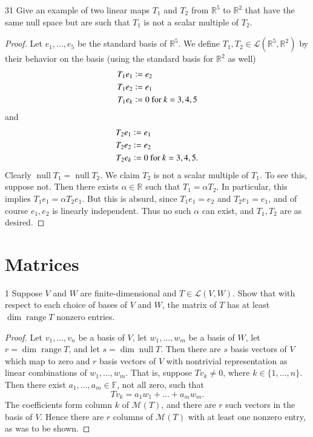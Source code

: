 \documentclass[11pt]{extarticle}
\newenvironment{problem}[1]{\begin{prob*}{#1}{}}{\end{prob*}}
\newcommand{\R}{\mathbb{R}}
\newcommand{\F}{\mathbb{F}}
\newcommand{\mat}{\mathcal{M}}
\newcommand{\Hom}{\mathcal{L}}
\DeclareMathOperator{\Null}{null}
\DeclareMathOperator{\Range}{range}
\newcommand{\defeq}{\vcentcolon=}
\begin{document}
\begin{problem}{31}
Give an example of two linear maps $T_1$ and $T_2$ from $\R^5$ to $\R^2$ that have the same null space but are such that $T_1$ is not a scalar multiple of $T_2$.  
\end{problem}
\begin{proof}
Let $e_1,\dots, e_5$ be the standard basis of $\R^5$.  We define $T_1,T_2\in\Hom(\R^5,\R^2)$ by their behavior on the basis (using the standard basis for $\R^2$ as well)
\begin{align*}
T_1e_1 &\defeq e_2\\
T_1e_2 &\defeq e_1\\
T_1e_k &\defeq 0 \text{ for }k = 3, 4, 5
\end{align*} 
and 
\begin{align*}
T_2e_1 &\defeq e_1\\
T_2e_2 &\defeq e_2\\
T_2e_k &\defeq 0 \text{ for }k = 3, 4, 5.
\end{align*}
Clearly $\Null T_1 = \Null T_2$.  We claim $T_2$ is not a scalar multiple of $T_1$.  To see this, suppose not.  Then there exists $\alpha\in\R$ such that $T_1 = \alpha T_2$.  In particular, this implies $T_1e_1 = \alpha T_2e_1$.  But this is absurd, since $T_1e_1 = e_2$ and $T_2e_1 = e_1$, and of course $e_1,e_2$ is linearly independent.  Thus no such $\alpha$ can exist, and $T_1,T_2$ are as desired.
\end{proof}


\section{Matrices}

\begin{problem}{1}
Suppose $V$ and $W$ are finite-dimensional and $T\in\Hom(V,W)$.  Show that with respect to each choice of bases of $V$ and $W$, the matrix of $T$ has at least $\dim\Range T$ nonzero entries.
\end{problem}
\begin{proof}
Let $v_1,\dots, v_n$ be a basis of $V$, let $w_1,\dots, w_m$ be a basis of $W$, let $r = \dim\Range T$, and let $s = \dim\Null T$.  Then there are $s$ basis vectors of $V$ which map to zero and $r$ basis vectors of $V$ with nontrivial representation as linear combinations of $w_1,\dots, w_m$.  That is, suppose $Tv_k\neq 0$, where $k\in\{1,\dots, n\}$. Then there exist $a_1,\dots, a_m\in\F$, not all zero, such that
\begin{equation*}
Tv_k = a_1w_1 + \dots + a_mw_m.
\end{equation*}
The coefficients form column $k$ of $\mat(T)$, and there are $r$ such vectors in the basis of $V$.  Hence there are $r$ columns of $\mat(T)$ with at least one nonzero entry, as was to be shown. 
\end{proof}
\end{document}
